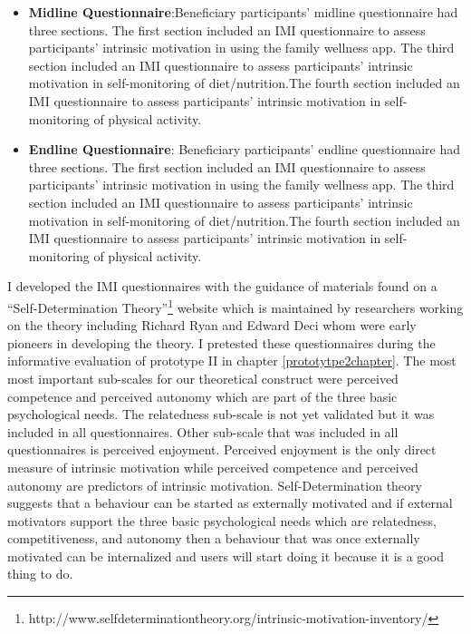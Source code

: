 \begin{enumerate}
\begin{itemize}
\item{\textbf{Midline Questionnaire}}:Beneficiary participants' midline questionnaire had three sections. The first section included an IMI questionnaire  to assess participants' intrinsic motivation in using the family wellness app. The third section included an IMI questionnaire to assess participants' intrinsic motivation in self-monitoring of diet/nutrition.The fourth section included an IMI questionnaire to assess participants' intrinsic motivation in self-monitoring of physical activity.

\item{\textbf{Endline Questionnaire}}: Beneficiary participants' endline questionnaire had three sections. The first section included an IMI questionnaire  to assess participants' intrinsic motivation in using the family wellness app. The third section included an IMI questionnaire to assess participants' intrinsic motivation in self-monitoring of diet/nutrition.The fourth section included an IMI questionnaire to assess participants' intrinsic motivation in self-monitoring of physical activity.
\end{itemize}
\end{enumerate}

I developed the IMI questionnaires with the guidance of materials found on a ``Self-Determination Theory''\footnote{http://www.selfdeterminationtheory.org/intrinsic-motivation-inventory/} website which is maintained by researchers working on the theory including Richard Ryan and Edward Deci\citep{deci1985intrinsic} whom were early pioneers in developing the theory. I pretested these questionnaires during the informative evaluation of prototype II in chapter \ref{prototytpe2chapter}.  The most most important sub-scales for our theoretical construct were perceived competence and perceived autonomy which are part of the three basic psychological needs. The relatedness sub-scale is not yet validated but it was included in all questionnaires. Other sub-scale that was included in all questionnaires is perceived enjoyment. Perceived enjoyment is the only direct measure of intrinsic motivation while perceived competence and perceived autonomy are predictors of intrinsic motivation. Self-Determination theory suggests that a behaviour can be started as externally motivated and if external motivators support the three basic psychological needs which are relatedness, competitiveness, and autonomy then a behaviour that was once externally motivated can be internalized and users will start doing it because it is a good thing to do.

